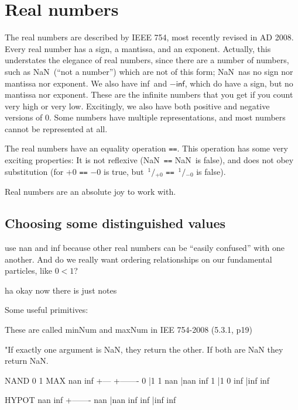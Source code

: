 \documentclass[twocolumn]{article}
\newcommand\sfrac[2]{\!{}\,^{#1}\!/{}\!_{#2}}
\newcommand\nan{\textsf{NaN}}
\renewcommand\inf{\textsf{inf}}
\begin{document}
\section{Real numbers}
The real numbers are described by IEEE 754, most recently revised in
AD 2008\cite{ieee754}. Every real number has a sign, a mantissa, and an
exponent. Actually, this understates the elegance of real numbers,
since there are a number of numbers, such as \nan\ (``not a number'')
which are not of this form; \nan\ nas no sign nor mantissa nor
exponent. We also have \inf\ and $-\inf$, which do have a sign, but no
mantissa nor exponent. These are the infinite numbers that you get if
you count very high or very low. Excitingly, we also have both
positive and negative versions of 0. Some numbers have multiple
representations, and most numbers cannot be represented at all.

The real numbers have an equality operation {\tt ==}. This operation
has some very exciting properties: It is not reflexive (\nan\ {\tt ==}
\nan\ is false), and does not obey substitution (for $+0$ {\tt ==} $-0$
is true, but $\sfrac{1}{+0}$ {\tt ==} $\sfrac{1}{-0}$ is false).

Real numbers are an absolute joy to work with.


\subsection{Choosing some distinguished values} \label{sec:distinguished}



use nan and inf because other real numbers can be ``easily confused''
with one another. And do we really want ordering relationships on
our fundamental particles, like $0 < 1$?




ha okay now there is just notes

Some useful primitives:

        These are called minNum and maxNum in IEE 754-2008 (5.3.1, p19)

        "If exactly one argument is NaN, they return the other.
        If both are NaN they return NaN.

        NAND  0 1     MAX  nan inf
             +---         +-------
           0 |1 1     nan |nan inf
           1 |1 0     inf |inf inf

                    HYPOT  nan inf
                          +-------
                      nan |nan inf
                      inf |inf inf
\end{document}

